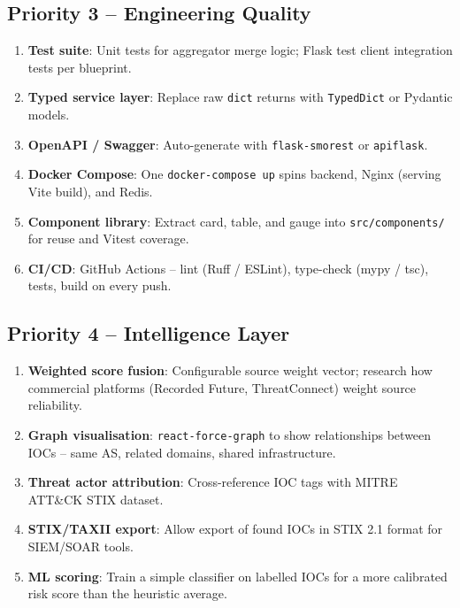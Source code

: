 \documentclass[11pt,a4paper]{article}
\begin{document}
\subsection{Priority 3 -- Engineering Quality}
\begin{enumerate}
  \item \textbf{Test suite}: Unit tests for aggregator merge logic; Flask test client integration tests per blueprint.
  \item \textbf{Typed service layer}: Replace raw \texttt{dict} returns with \texttt{TypedDict} or Pydantic models.
  \item \textbf{OpenAPI / Swagger}: Auto-generate with \texttt{flask-smorest} or \texttt{apiflask}.
  \item \textbf{Docker Compose}: One \texttt{docker-compose up} spins backend, Nginx (serving Vite build), and Redis.
  \item \textbf{Component library}: Extract card, table, and gauge into \texttt{src/components/} for reuse and Vitest coverage.
  \item \textbf{CI/CD}: GitHub Actions -- lint (Ruff / ESLint), type-check (mypy / tsc), tests, build on every push.
\end{enumerate}

\subsection{Priority 4 -- Intelligence Layer}
\begin{enumerate}
  \item \textbf{Weighted score fusion}: Configurable source weight vector; research how commercial platforms (Recorded Future, ThreatConnect) weight source reliability.
  \item \textbf{Graph visualisation}: \texttt{react-force-graph} to show relationships between IOCs -- same AS, related domains, shared infrastructure.
  \item \textbf{Threat actor attribution}: Cross-reference IOC tags with MITRE ATT\&CK STIX dataset.
  \item \textbf{STIX/TAXII export}: Allow export of found IOCs in STIX 2.1 format for SIEM/SOAR tools.
  \item \textbf{ML scoring}: Train a simple classifier on labelled IOCs for a more calibrated risk score than the heuristic average.
\end{enumerate}

\newpage

\end{document}
